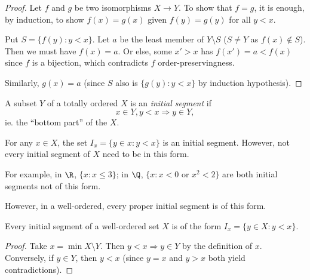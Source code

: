 \documentclass[a4paper]{article}
\begin{document}
\begin{proof}
  Let $f$ and $g$ be two isomorphisms $X\to Y$. To show that $f = g$, it is enough, by induction, to show $f(x) = g(x)$ given $f(y) = g(y)$ for all $y < x$.

  Put $S = \{f(y): y < x\}$. Let $a$ be the least member of $Y\setminus S$ ($S\not= Y$ as $f(x) \not\in S$). Then we must have $f(x) = a$. Or else, some $x ' > x$ has $f(x') = a < f(x)$ since $f$ is a bijection, which contradicts $f$ order-preservingness.

  Similarly, $g(x) = a$ (since $S$ also is $\{g(y): y < x\}$ by induction hypothesis).
\end{proof}


\begin{defi}
  A subset $Y$ of a totally ordered $X$ is an \emph{initial segment} if
  \[
    x\in Y, y< x \Rightarrow  y\in Y,
  \]
  ie. the ``bottom part'' of the $X$.
  \begin{center}
  \end{center}
\end{defi}

\begin{eg}
  For any $x\in X$, the set $I_x = \{y\in x: y< x\}$ is an initial segment. However, not every initial segment of $X$ need to be in this form.

  For example, in $\R$, $\{x: x\leq 3\}$; in $\Q$, $\{x: x < 0\text{ or }x^2 < 2\}$ are both initial segments not of this form.
\end{eg}
However, in a well-ordered, every proper initial segment is of this form.
\begin{prop}
  Every initial segment of a well-ordered set $X$ is of the form $I_x = \{y\in X: y < x\}$.
\end{prop}

\begin{proof}
  Take $x = \min X\setminus Y$. Then $y < x\Rightarrow y\in Y$ by the definition of $x$.  Conversely, if $y\in Y$, then $y < x$ (since $y = x$ and $y > x$ both yield contradictions).
\end{proof}
\end{document}
